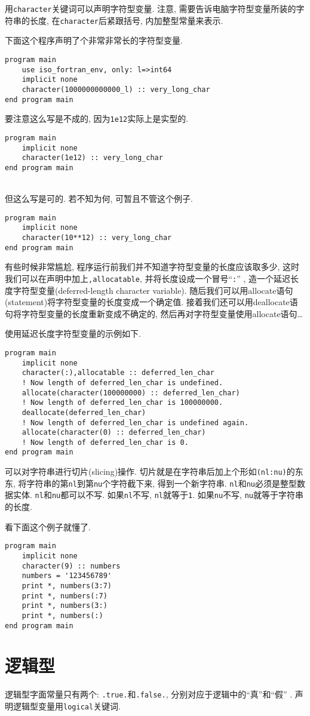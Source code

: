 用\texttt{character}关键词可以声明字符型变量. 注意, 需要告诉电脑字符型变量所装的字符串的长度, 在\texttt{character}后紧跟括号, 内加整型常量来表示.

下面这个程序声明了个非常非常长的字符型变量.
\begin{lstlisting}
program main
    use iso_fortran_env, only: l=>int64
    implicit none
    character(1000000000000_l) :: very_long_char
end program main
\end{lstlisting}

要注意这么写是不成的, 因为\texttt{1e12}实际上是实型的.
\begin{lstlisting}
program main
    implicit none
    character(1e12) :: very_long_char
end program main
\end{lstlisting}\mbox{}\\
但这么写是可的. 若不知为何, 可暂且不管这个例子.
\begin{lstlisting}
program main
    implicit none
    character(10**12) :: very_long_char
end program main
\end{lstlisting}

有些时候非常尴尬, 程序运行前我们并不知道字符型变量的长度应该取多少, 这时我们可以在声明中加上\texttt{,allocatable}, 并将长度设成一个冒号``\texttt{:}'' , 造一个延迟长度字符型变量(deferred-length character variable). 随后我们可以用allocate语句(statement)将字符型变量的长度变成一个确定值. 接着我们还可以用deallocate语句将字符型变量的长度重新变成不确定的, 然后再对字符型变量使用allocate语句\dots

使用延迟长度字符型变量的示例如下.
\begin{lstlisting}
program main
    implicit none
    character(:),allocatable :: deferred_len_char
    ! Now length of deferred_len_char is undefined.
    allocate(character(100000000) :: deferred_len_char)
    ! Now length of deferred_len_char is 100000000.
    deallocate(deferred_len_char)
    ! Now length of deferred_len_char is undefined again.
    allocate(character(0) :: deferred_len_char)
    ! Now length of deferred_len_char is 0.
end program main
\end{lstlisting}

可以对字符串进行切片(slicing)操作. 切片就是在字符串后加上个形如\texttt{(nl:nu)}的东东, 将字符串的第\texttt{nl}到第\texttt{nu}个字符截下来, 得到一个新字符串. \texttt{nl}和\texttt{nu}必须是整型数据实体. \texttt{nl}和\texttt{nu}都可以不写. 如果\texttt{nl}不写, \texttt{nl}就等于\texttt{1}. 如果\texttt{nu}不写, \texttt{nu}就等于字符串的长度.

看下面这个例子就懂了.
\newpage
\begin{lstlisting}
program main
    implicit none
    character(9) :: numbers
    numbers = '123456789'
    print *, numbers(3:7)
    print *, numbers(:7)
    print *, numbers(3:)
    print *, numbers(:)
end program main
\end{lstlisting}

\section{逻辑型}

逻辑型字面常量只有两个: \texttt{.true.}和\texttt{.false.}, 分别对应于逻辑中的``真''和``假'' . 声明逻辑型变量用\texttt{logical}关键词.
